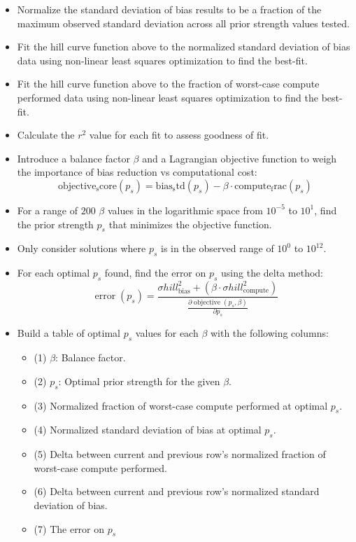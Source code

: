     \begin{itemize}
        \item Normalize the standard deviation of bias results to be a fraction of the maximum observed standard deviation across all prior strength values tested.
        \item Fit the hill curve function above to the normalized standard deviation of bias data using non-linear least squares optimization to find the best-fit.
        \item Fit the hill curve function above to the fraction of worst-case compute performed data using non-linear least squares optimization to find the best-fit.
        \item Calculate the $r^2$ value for each fit to assess goodness of fit.
        \item Introduce a balance factor $\beta$ and a Lagrangian objective function \cite{Everett1963} to weigh the importance of bias reduction vs computational cost:
        \[
            \operatorname{objective_score}(p_s) = \operatorname{bias_std}(p_s) - \beta \cdot \operatorname{compute_frac}(p_s)
        \]
        \item For a range of $200$ $\beta$ values in the logarithmic space from $10^{-5}$ to $10^{1}$, find the prior strength $p_s$ that minimizes the objective function.
        \item Only consider solutions where $p_s$ is in the observed range of $10^{0}$ to $10^{12}$.
        \item For each optimal $p_s$ found, find the error on $p_s$ using the delta method:
        \[
            \operatorname{error}(p_s) = \frac{\sigma hill_{\operatorname{bias}}^2 + (\beta \cdot \sigma hill_{\operatorname{compute}}^2) }{\frac{\partial \operatorname{objective}(p_s, \beta) }{\partial p_s}}
        \]
        \item Build a table of optimal $p_s$ values for each $\beta$ with the following columns:
        \begin{itemize}
            \item (1) $\beta$: Balance factor.
            \item (2) $p_s$: Optimal prior strength for the given $\beta$.
            \item (3) Normalized fraction of worst-case compute performed at optimal $p_s$.
            \item (4) Normalized standard deviation of bias at optimal $p_s$.
            \item (5) Delta between current and previous row's normalized fraction of worst-case compute performed.
            \item (6) Delta between current and previous row's normalized standard deviation of bias.
            \item (7) The error on $p_s$
        \end{itemize}
    \end{itemize}

